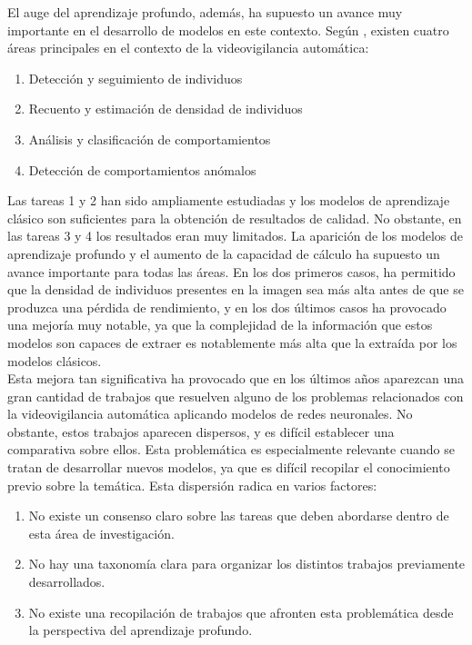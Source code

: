 \documentclass[../main.tex]{book}
\begin{document}
El auge del aprendizaje profundo, además, ha supuesto un avance muy
importante en el desarrollo de modelos en este contexto. Según
\cite{zitouni2016advances}, existen cuatro áreas principales en el
contexto de la videovigilancia automática:

\begin{enumerate}
\item Detección y seguimiento de individuos
\item Recuento y estimación de densidad de individuos
\item Análisis y clasificación de comportamientos
\item Detección de comportamientos anómalos
\end{enumerate}

Las tareas 1 y 2 han sido ampliamente estudiadas y los modelos de
aprendizaje clásico son suficientes para la obtención de resultados de
calidad. No obstante, en las tareas 3 y 4 los resultados eran muy
limitados. La aparición de los modelos de aprendizaje profundo y el
aumento de la capacidad de cálculo ha supuesto un avance importante
para todas las áreas. En los dos primeros casos, ha permitido que la
densidad de individuos presentes en la imagen sea más alta antes de
que se produzca una pérdida de rendimiento, y en los dos últimos casos
ha provocado una mejoría muy notable, ya que la complejidad de la
información que estos modelos son capaces de extraer es notablemente
más alta que la extraída por los modelos clásicos.\\

Esta mejora tan significativa ha provocado que en los últimos años
aparezcan una gran cantidad de trabajos que resuelven alguno de los
problemas relacionados con la videovigilancia automática aplicando
modelos de redes neuronales. No obstante, estos trabajos aparecen
dispersos, y es difícil establecer una comparativa sobre ellos. Esta
problemática es especialmente relevante cuando se tratan de
desarrollar nuevos modelos, ya que es difícil recopilar el
conocimiento previo sobre la temática. Esta dispersión radica en
varios factores:\\

\begin{enumerate}
\item No existe un consenso claro sobre las tareas que deben abordarse
  dentro de esta área de investigación.
\item No hay una taxonomía clara para organizar los distintos trabajos
  previamente desarrollados.
\item No existe una recopilación de trabajos que afronten esta
  problemática desde la perspectiva del aprendizaje profundo.
\end{enumerate}
\end{document}
